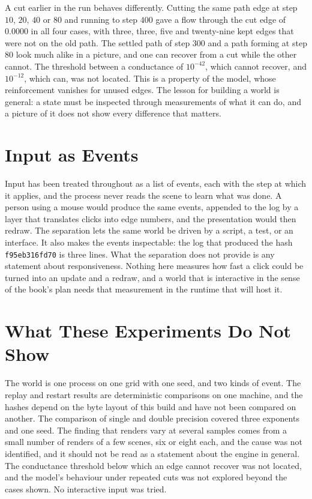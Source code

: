 A cut earlier in the run behaves differently. Cutting the same path edge at step $10$, $20$, $40$ or $80$ and running to step $400$ gave a flow through the cut edge of $0.0000$ in all four cases, with three, three, five and twenty-nine kept edges that were not on the old path. The settled path of step $300$ and a path forming at step $80$ look much alike in a picture, and one can recover from a cut while the other cannot. The threshold between a conductance of $10^{-42}$, which cannot recover, and $10^{-12}$, which can, was not located. This is a property of the model, whose reinforcement vanishes for unused edges. The lesson for building a world is general: a state must be inspected through measurements of what it can do, and a picture of it does not show every difference that matters.

\section{Input as Events}

Input has been treated throughout as a list of events, each with the step at which it applies, and the process never reads the scene to learn what was done. A person using a mouse would produce the same events, appended to the log by a layer that translates clicks into edge numbers, and the presentation would then redraw. The separation lets the same world be driven by a script, a test, or an interface. It also makes the events inspectable: the log that produced the hash \texttt{f95eb316fd70} is three lines. What the separation does not provide is any statement about responsiveness. Nothing here measures how fast a click could be turned into an update and a redraw, and a world that is interactive in the sense of the book's plan needs that measurement in the runtime that will host it.

\section{What These Experiments Do Not Show}

The world is one process on one grid with one seed, and two kinds of event. The replay and restart results are deterministic comparisons on one machine, and the hashes depend on the byte layout of this build and have not been compared on another. The comparison of single and double precision covered three exponents and one seed. The finding that renders vary at several samples comes from a small number of renders of a few scenes, six or eight each, and the cause was not identified, and it should not be read as a statement about the engine in general. The conductance threshold below which an edge cannot recover was not located, and the model's behaviour under repeated cuts was not explored beyond the cases shown. No interactive input was tried.

